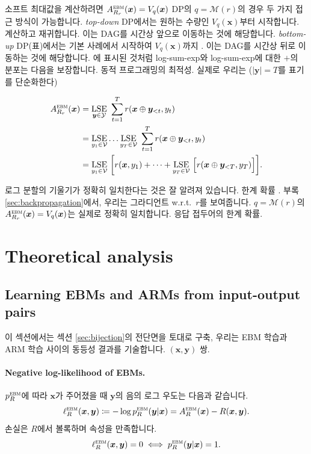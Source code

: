\documentclass{article}
\def\x{{\bm{x}}}
\def\y{{\bm{y}}}
\def\cM{{\mathcal{M}}}
\def\cV{{\mathcal{V}}}
\def\cY{{\mathcal{Y}}}
\newcommand{\Rsub}[1]{R_{#1}}
\def\ebm{{\textsc{ebm}}}
\def\lse{{\mathrm{LSE}}}
\def\wrt{{w.r.t.\ }}
\begin{document}
소프트 최대값을 계산하려면 
 $A^\ebm_{\Rsub{r}}(\x) = V_q(\x)$ 
DP의 $q = \cM(r)$의 경우 두 가지 접근 방식이 가능합니다.
\textit{top-down} DP에서는 원하는 수량인 $V_q(\x)$부터 시작합니다.
계산하고 재귀합니다. 이는 DAG를 시간상 앞으로 이동하는 것에 해당합니다.
\textit{bottom-up} DP(표)에서는 기본 사례에서 시작하여
$V_q(\x)$까지 .  이는 DAG를 시간상 뒤로 이동하는 것에 해당합니다.
\citep{mensch2018differentiable} 에 표시된 것처럼
log-sum-exp와 log-sum-exp에 대한 $+$의 분포는 다음을 보장합니다.
동적 프로그래밍의 최적성. 실제로 우리는 ($|\y| = T$를
표기를 단순화한다)
 \begin{small} 
 \begin{align} 
A^ \ebm _{ \Rsub{r} }( \x )
&= \underset{\y \in \cY} { \lse } ~ \sum _{t=1}^T r( \x \oplus \y _{<t}, y_t) \\
&= \underset{y_1 \in \cV} { \lse } \dots \underset{y_T \in \cV} { \lse } ~
 \sum _{t=1}^T r( \x \oplus \y _{<t}, y_t) \\
&= \underset{y_1 \in \cV} { \lse } ~ \biggl [ r( \x , y_1)
+ \dots + \underset{y_T \in \cV} { \lse } ~ \Bigl [ r( \x \oplus \y _{<T}, y_T) \Bigr ] \biggr ].
 \end{align} 
 \end{small} 
로그 분할의 기울기가 정확히 일치한다는 것은 잘 알려져 있습니다.
한계 확률 \citep{wainwright2008graphical} .
부록 \ref{sec:backpropagation}에서,
우리는 그라디언트 \wrt $r$를 보여줍니다.
 $q = \cM(r)$의 $A^\ebm_{\Rsub{r}}(\x) = V_q(\x)$는 실제로 정확히 일치합니다.
응답 접두어의 한계 확률.

\section{Theoretical analysis}

\subsection{Learning EBMs and ARMs from input-output pairs} 
 \label{sec:minima}

이 섹션에서는 
섹션 \ref{sec:bijection}의 전단면을 토대로 구축,
우리는 EBM 학습과 ARM 학습 사이의 동등성 결과를 기술합니다.
 $(\x, \y)$ 쌍.

\paragraph{Negative log-likelihood of EBMs.}

$p^\ebm_R$에 따라 $\x$가 주어졌을 때 $\y$의 음의 로그 우도는 다음과 같습니다.
 \begin{equation} \label{eq:lebm} 
 \ell ^ \ebm _R( \x , \y ) 
 \coloneqq - \log p^ \ebm _R( \y | \x ) 
= A^ \ebm _R( \x ) - R( \x , \y ).
 \end{equation} 
손실은 $R$에서 볼록하며 속성을 만족합니다.
 \begin{equation} 
 \ell ^ \ebm _R( \x , \y ) = 0 \iff p^ \ebm _R( \y | \x ) = 1.
 \end{equation}
\end{document}
